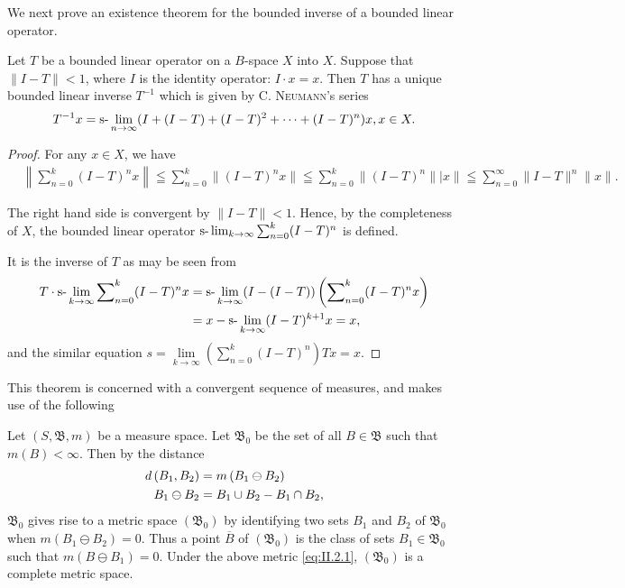 We next prove an existence theorem for the bounded inverse of a bounded linear operator. 

\begin{theorem}\label{thm:II.1.Theorem.2} Let $T$ be a bounded linear operator on a $B$-space $X$ into $X$. Suppose that $\|I - T\| < 1$, where $I$ is the identity operator: $I \cdot x = x$. Then $T$ has a unique bounded linear inverse $T^{-1}$ which is given by C. \textsc{Neumann}'s series 
\begin{equation}\label{eq:II.1.2}
T ^{-1} x = \text{s-}\lim _{n \rightarrow \infty} (I + (I - T) + (I - T) ^{2} + \dots + (I - T) ^{n}) x, x \in X.
\end{equation}
\end{theorem}

\begin{proof}
 For any $x \in X$, we have 
\[ \begin{aligned}
&\left\| \sum\limits_{n=0} ^{k} (I - T) ^{n} x \right\|  \leqq \sum\limits_{n=0} ^{k} \| (I - T) ^{n} x \| \leqq \sum\limits_{n=0} ^{k} \| (I - T) ^{n} \| | x \| \leqq \sum\limits_{n=0} ^{\infty} \| I - T \| ^{n} \| x \|.
\end{aligned}
\]

The right hand side is convergent by $\|I - T\| < 1$. Hence, by the completeness of $X$, the bounded linear operator $\text{s-}\lim\nolimits_{k \to \infty} \sum\nolimits_{n=0}^{k} (I - T)^n$ is defined. 


It is the inverse of $T$ as may be seen from 
\[
\begin{aligned}T \cdot \text{s-}\lim _{k \rightarrow \infty} \sum\nolimits_{n=0} ^{k} (I - T) ^{n} x&= \text{s-}\lim _{k \rightarrow \infty} (I - (I - T)) \left(\sum\nolimits_{n=0} ^{k} (I - T) ^{n} x\right)\\&= x - \text{s-}\lim _{k \rightarrow \infty} (I - T) ^{k+1} x = x,\end{aligned}
\]
and the similar equation $s = \lim\limits_{k \to \infty} \left( \sum\limits_{n=0}^{k} (I - T)^n \right) Tx = x$.
\end{proof}

\label{sec:II.2}

This theorem is concerned with a convergent sequence of measures, and makes use of the following 

\begin{propositionu} Let $(S, \mathfrak{B}, m)$ be a measure space. Let $\mathfrak{B}_0$ be the set of all $B \in \mathfrak{B}$ such that $m(B) < \infty$. Then by the distance 
\begin{align}
d \left(B _{1}, B _{2}\right)& = m \left(B _{1} \ominus B _{2}\right) \notag \\
B _{1} \ominus B _{2}& = B _{1} \cup B _{2} - B _{1} \cap B _{2}, \label{eq:II.2.1}
\end{align}
$\mathfrak{B}_0$ gives rise to a metric space $(\mathfrak{B}_0)$ by identifying two sets $B_1$ and $B_2$ of $\mathfrak{B}_0$ when $m(B_1 \ominus B_2) = 0$. Thus a point $\overline{B}$ of $(\mathfrak{B}_0)$ is the class of sets $B_1 \in \mathfrak{B}_0$ such that $m(B \ominus B_1) = 0$. Under the above metric \eqref{eq:II.2.1}, $(\mathfrak{B}_0)$ is a complete metric space. 
\end{propositionu}

